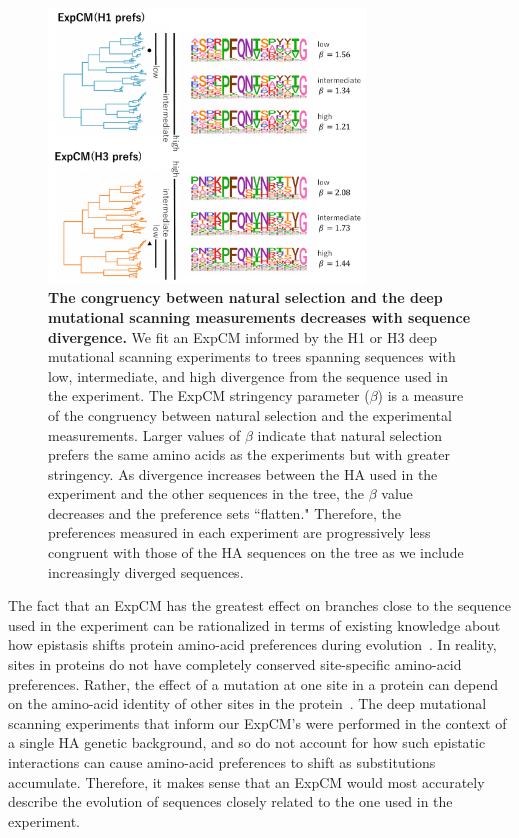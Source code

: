 \documentclass[11pt]{article}
\begin{document}
\begin{figure}
\centerline{\includegraphics[width=0.75\textwidth]{figures/compete}}
\caption{\label{fig:compete}
\textbf{The congruency between natural selection and the deep mutational scanning measurements decreases with sequence divergence.} 
We fit an ExpCM informed by the H1 or H3 deep mutational scanning experiments to trees spanning sequences with low, intermediate, and high divergence from the sequence used in the experiment. 
The ExpCM stringency parameter ($\beta$) is a measure of the congruency between natural selection and the experimental measurements. 
Larger values of $\beta$ indicate that natural selection prefers the same amino acids as the experiments but with greater stringency. 
As divergence increases between the HA used in the experiment and the other sequences in the tree, the $\beta$ value decreases and the preference sets ``flatten."
Therefore, the preferences measured in each experiment are progressively less congruent with those of the HA sequences on the tree as we include increasingly diverged sequences. 
}
\end{figure}

The fact that an ExpCM has the greatest effect on branches close to the sequence used in the experiment can be rationalized in terms of existing knowledge about how epistasis shifts protein amino-acid preferences during evolution~\citep{pollock2012amino, shah2015contingency, doud2015site, haddox2017mapping, risso2014mutational}.
In reality, sites in proteins do not have completely conserved site-specific amino-acid preferences. 
Rather, the effect of a mutation at one site in a protein can depend on the amino-acid identity of other sites in the protein~\citep{starr2018pervasive, pollock2012amino, shah2015contingency, bazykin2015changing}. 
The deep mutational scanning experiments that inform our ExpCM's were performed in the context of a single HA genetic background, and so do not account for how such epistatic interactions can cause amino-acid preferences to shift as substitutions accumulate. 
Therefore, it makes sense that an ExpCM would most accurately describe the evolution of sequences closely related to the one used in the experiment.
 
\end{document}
